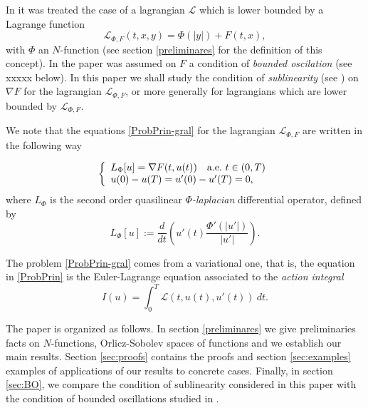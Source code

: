 \documentclass[twoside]{article}
\theoremstyle{remark}
\newcounter{example}
\begin{document}
In \cite{ABGMS2015} it was treated  the case of a lagrangian $\mathcal{L}$ which is lower bounded by a Lagrange function
\begin{equation}\label{eq:lagrange_phi}
\mathcal{L}_{\Phi,F}(t,x,y)=\Phi(|y|)+F(t,x),
\end{equation}
with $\Phi$ an $N$-function (see section \ref{preliminares} for the definition of this concept).  In the paper \cite{ABGMS2015} was assumed on $F$  a condition of \emph{bounded oscilation} (see xxxxx below). 
In this paper we shall study the condition of \emph{sublinearity} (see  \cite{tang1998periodic,wu1999periodic,zhao2004periodic,tang2010periodic,zhao2005existence}) on $\nabla F$ for the lagrangian  $\mathcal{L}_{\Phi,F}$, or more generally for lagrangians which are lower bounded by $\mathcal{L}_{\Phi,F}$.

We note that the equations \eqref{ProbPrin-gral} for the lagrangian $\mathcal{L}_{\Phi,F}$ are written in the following way

\begin{equation}\label{ProbPrin}
    \left\{%
\begin{array}{ll}
    L_{\Phi}[u]= \nabla F(t,u(t)) \quad \hbox{a.e.}\ t \in (0,T)\\
    u(0)-u(T)=u'(0)-u'(T)=0,
\end{array}%
\right.
\end{equation}
where $L_{\Phi}$ is the second order quasilinear  \emph{$\Phi$-laplacian} differential operator, defined by
\[L_{\Phi}[u]:=\frac{d}{dt}\left(u'(t)\frac{\Phi'(|u'|)}{|u'|}\right). \]




The problem \eqref{ProbPrin-gral} comes from a variational one, that is,  the equation in  \eqref{ProbPrin}  is the Euler-Lagrange equation associated to the \emph{action integral}
\begin{equation}\label{integral_accion}
I(u)=\int_{0}^T \mathcal{L}(t,u(t),u'(t))\ dt.
\end{equation}

The paper is organized as follows. In section \ref{preliminares} we give preliminaries facts on $N$-functions, Orlicz-Sobolev spaces of functions and we establish our main results. Section \ref{sec:proofs} contains the proofs and section \ref{sec:examples} examples of applications of our results to concrete cases. Finally, in section \ref{sec:BO}, we compare the condition of sublinearity considered in this paper with the condition of bounded oscillations studied in \cite{ABGMS2015}.
\end{document}
